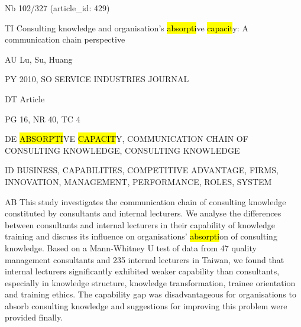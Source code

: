 \documentclass[a4paper]{article}
\begin{document}
\vspace*{-2cm}
Nb \tabto{0cm}102/327 (article\_id: 429)\par
TI \tabto{0cm}Consulting knowledge and organisation's \hl{absorpti}ve \hl{capacit}y: A communication chain perspective\par
AU \tabto{0cm}Lu, Su, Huang\par
PY \tabto{0cm}2010, SO SERVICE INDUSTRIES JOURNAL\par
DT \tabto{0cm}Article\par
PG \tabto{0cm}16, NR 40, TC 4\par
DE \tabto{0cm}\hl{ABSORPTI}VE \hl{CAPACIT}Y, COMMUNICATION CHAIN OF CONSULTING KNOWLEDGE, CONSULTING KNOWLEDGE\par
ID \tabto{0cm}BUSINESS, CAPABILITIES, COMPETITIVE ADVANTAGE, FIRMS, INNOVATION, MANAGEMENT, PERFORMANCE, ROLES, SYSTEM\par
AB \tabto{0cm}This study investigates the communication chain of consulting knowledge constituted by consultants and internal lecturers. We analyse the differences between consultants and internal lecturers in their capability of knowledge training and discuss its influence on organisations' \hl{absorpti}on of consulting knowledge. Based on a Mann-Whitney U test of data from 47 quality management consultants and 235 internal lecturers in Taiwan, we found that internal lecturers significantly exhibited weaker capability than consultants, especially in knowledge structure, knowledge transformation, trainee orientation and training ethics. The capability gap was disadvantageous for organisations to absorb consulting knowledge and suggestions for improving this problem were provided finally.\par
\clearpage
\end{document}
